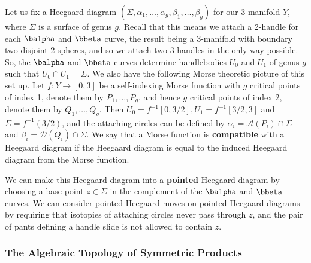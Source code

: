 Let us fix a Heegaard diagram $(\Sigma,\alpha_1,\ldots,\alpha_g,\beta_1,\ldots,\beta_g)$ for our 3-manifold $Y$, where $\Sigma$ is a surface of genus $g$. Recall that this means we attach a 2-handle for each $\balpha$ and $\bbeta$ curve, the result being a 3-manifold with boundary two disjoint 2-spheres, and so we attach two 3-handles in the only way possible. So, the $\balpha$ and $\bbeta$ curves determine handlebodies $U_0$ and $U_1$ of genus $g$ such that $U_0 \cap U_1 = \Sigma$. We also have the following Morse theoretic picture of this set up. Let $f : Y \rightarrow [0,3]$ be a self-indexing Morse function with $g$ critical points of index 1, denote them by $P_1,\ldots,P_g$, and hence $g$ critical points of index 2, denote them by $Q_1,\ldots,Q_g$. Then $U_0 = f^{-1}[0,3/2], U_1=f^{-1}[3/2,3]$ and $\Sigma=f^{-1}(3/2)$, and the attaching circles can be defined by $\alpha_i = \mathscr A(P_i) \cap \Sigma$ and $\beta_i = \mathscr D(Q_i) \cap \Sigma$. We say that a Morse function is \textbf{compatible} with a Heegaard diagram if the Heegaard diagram is equal to the induced Heegaard diagram from the Morse function.

We can make this Heegaard diagram into a \textbf{pointed} Heegaard diagram by choosing a base point $z \in \Sigma$ in the complement of the $\balpha$ and $\bbeta$ curves. We can consider pointed Heegaard moves on pointed Heegaard diagrams by requiring that isotopies of attaching circles never pass through $z$, and the pair of pants defining a handle slide is not allowed to contain $z$. 

\subsubsection*{The Algebraic Topology of Symmetric Products}

